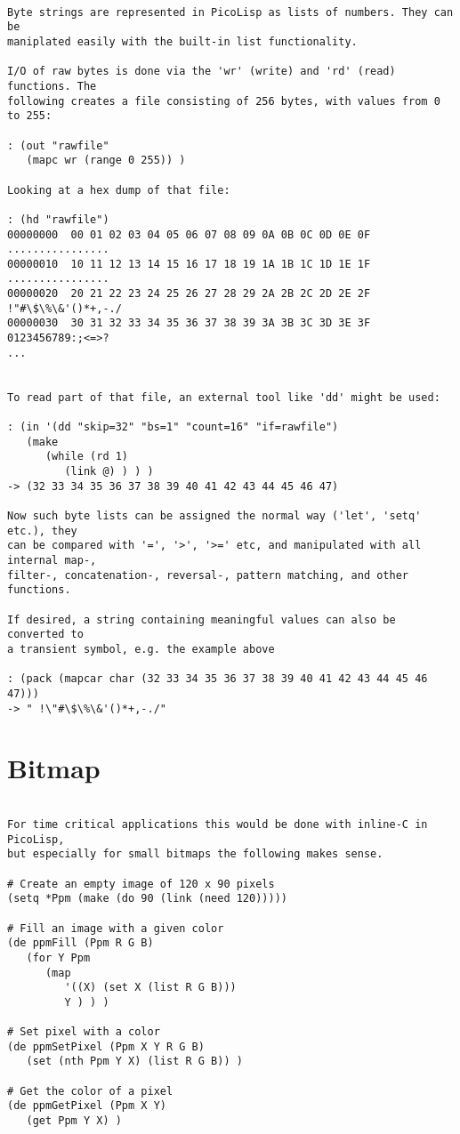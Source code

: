 \begin{verbatim}

Byte strings are represented in PicoLisp as lists of numbers. They can be
maniplated easily with the built-in list functionality.

I/O of raw bytes is done via the 'wr' (write) and 'rd' (read) functions. The
following creates a file consisting of 256 bytes, with values from 0 to 255:

: (out "rawfile"
   (mapc wr (range 0 255)) )

Looking at a hex dump of that file:

: (hd "rawfile")
00000000  00 01 02 03 04 05 06 07 08 09 0A 0B 0C 0D 0E 0F  ................
00000010  10 11 12 13 14 15 16 17 18 19 1A 1B 1C 1D 1E 1F  ................
00000020  20 21 22 23 24 25 26 27 28 29 2A 2B 2C 2D 2E 2F   !"#\$\%\&'()*+,-./
00000030  30 31 32 33 34 35 36 37 38 39 3A 3B 3C 3D 3E 3F  0123456789:;<=>?
...


To read part of that file, an external tool like 'dd' might be used:

: (in '(dd "skip=32" "bs=1" "count=16" "if=rawfile")
   (make
      (while (rd 1)
         (link @) ) ) )
-> (32 33 34 35 36 37 38 39 40 41 42 43 44 45 46 47)

Now such byte lists can be assigned the normal way ('let', 'setq' etc.), they
can be compared with '=', '>', '>=' etc, and manipulated with all internal map-,
filter-, concatenation-, reversal-, pattern matching, and other functions.

If desired, a string containing meaningful values can also be converted to
a transient symbol, e.g. the example above

: (pack (mapcar char (32 33 34 35 36 37 38 39 40 41 42 43 44 45 46 47)))
-> " !\"#\$\%\&'()*+,-./"

\end{verbatim}

\section*{Bitmap}

\begin{verbatim}

For time critical applications this would be done with inline-C in PicoLisp,
but especially for small bitmaps the following makes sense.

# Create an empty image of 120 x 90 pixels
(setq *Ppm (make (do 90 (link (need 120)))))

# Fill an image with a given color
(de ppmFill (Ppm R G B)
   (for Y Ppm
      (map
         '((X) (set X (list R G B)))
         Y ) ) )

# Set pixel with a color
(de ppmSetPixel (Ppm X Y R G B)
   (set (nth Ppm Y X) (list R G B)) )

# Get the color of a pixel
(de ppmGetPixel (Ppm X Y)
   (get Ppm Y X) )

\end{verbatim}

